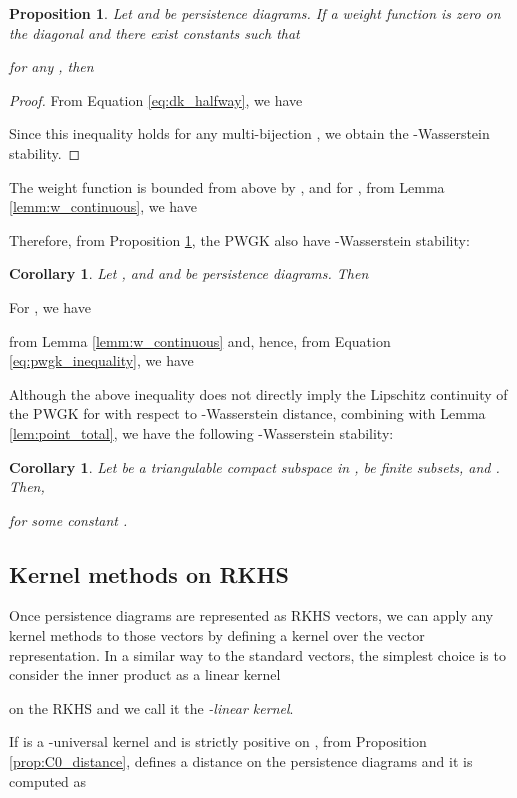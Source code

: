 \documentclass{article}
\newtheorem{prop}[thm]{Proposition}
\newtheorem{cor}[thm]{Corollary}
\begin{document}
\begin{prop}
\label{prop:pwgk_wasserstein}
Let  and  be persistence diagrams.
If a weight function  is zero on the diagonal and there exist constants  such that 

for any , then

\end{prop}

\begin{proof}
From Equation \eqref{eq:dk_halfway}, we have

Since this inequality holds for any multi-bijection ,  we obtain the -Wasserstein stability.
\end{proof}

The weight function  is bounded from above by , and for , from Lemma \ref{lemm:w_continuous}, we have

Therefore, from Proposition \ref{prop:pwgk_wasserstein}, the PWGK also have -Wasserstein stability:
\begin{cor}
Let , and  and  be persistence diagrams.
Then

\end{cor}

For , we have

from Lemma \ref{lemm:w_continuous} and, hence, from Equation \eqref{eq:pwgk_inequality}, we have

Although the above inequality does not directly imply the Lipschitz continuity of the PWGK for  with respect to -Wasserstein distance, combining with Lemma \ref{lem:point_total}, we have the following -Wasserstein stability:
\begin{cor}
Let  be a triangulable compact subspace in ,  be finite subsets, and .
Then,

for some constant .
\end{cor}



\subsection{Kernel methods on RKHS}

Once persistence diagrams are represented as RKHS vectors, we can apply any kernel methods to those vectors by defining a kernel over the vector representation.
In a similar way to the standard vectors, the simplest choice is to consider the inner product as a linear kernel

on the RKHS and we call it the {\em -linear kernel}.  

If  is a -universal kernel and  is strictly positive on , from Proposition \ref{prop:C0_distance},  defines a distance on the persistence diagrams and it is computed as 
\end{document}
